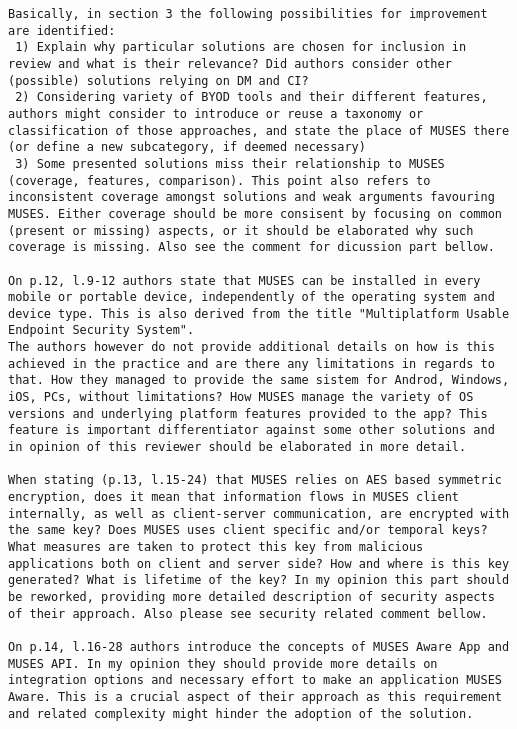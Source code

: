 \documentclass[preprint]{elsarticle}
\begin{document}
\begin{verbatim}
Basically, in section 3 the following possibilities for improvement are identified:
 1) Explain why particular solutions are chosen for inclusion in review and what is their relevance? Did authors consider other (possible) solutions relying on DM and CI?
 2) Considering variety of BYOD tools and their different features, authors might consider to introduce or reuse a taxonomy or classification of those approaches, and state the place of MUSES there (or define a new subcategory, if deemed necessary)
 3) Some presented solutions miss their relationship to MUSES (coverage, features, comparison). This point also refers to inconsistent coverage amongst solutions and weak arguments favouring MUSES. Either coverage should be more consisent by focusing on common (present or missing) aspects, or it should be elaborated why such coverage is missing. Also see the comment for dicussion part bellow.

On p.12, l.9-12 authors state that MUSES can be installed in every mobile or portable device, independently of the operating system and device type. This is also derived from the title "Multiplatform Usable Endpoint Security System".
The authors however do not provide additional details on how is this achieved in the practice and are there any limitations in regards to that. How they managed to provide the same sistem for Androd, Windows, iOS, PCs, without limitations? How MUSES manage the variety of OS versions and underlying platform features provided to the app? This feature is important differentiator against some other solutions and in opinion of this reviewer should be elaborated in more detail.

When stating (p.13, l.15-24) that MUSES relies on AES based symmetric encryption, does it mean that information flows in MUSES client internally, as well as client-server communication, are encrypted with the same key? Does MUSES uses client specific and/or temporal keys? What measures are taken to protect this key from malicious applications both on client and server side? How and where is this key generated? What is lifetime of the key? In my opinion this part should be reworked, providing more detailed description of security aspects of their approach. Also please see security related comment bellow.

On p.14, l.16-28 authors introduce the concepts of MUSES Aware App and MUSES API. In my opinion they should provide more details on integration options and necessary effort to make an application MUSES Aware. This is a crucial aspect of their approach as this requirement and related complexity might hinder the adoption of the solution.


\end{verbatim}
\end{document}
